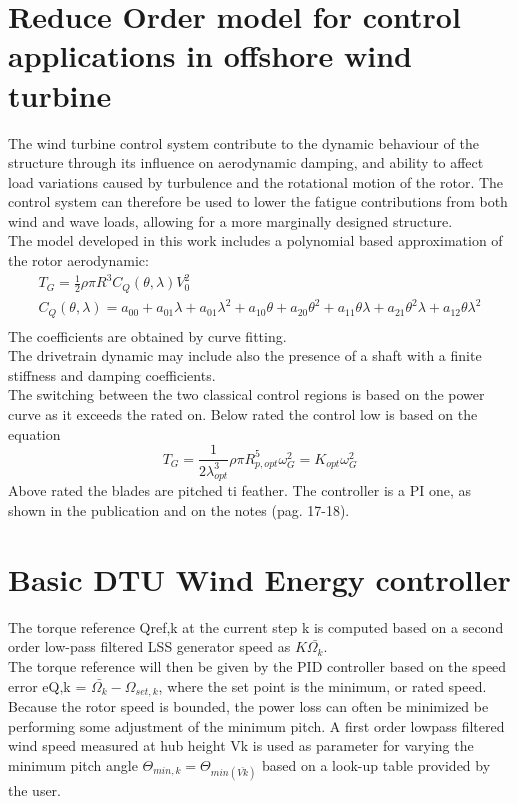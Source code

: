 \documentclass[]{article}
\begin{document}
\newpage
\section{Reduce Order model for control applications in offshore wind turbine  \cite{SMILDEN2016386}}
The wind turbine control system contribute to the dynamic behaviour of the structure through its influence on aerodynamic damping, and ability to affect load variations caused by turbulence and the rotational motion of the rotor. The control system can therefore be used to lower the fatigue contributions from both wind and wave loads, allowing for a more marginally designed structure. \\ 
The model developed in this work includes a polynomial based approximation of the rotor aerodynamic:
\begin{gather}
	T_G = \frac{1}{2}\rho\pi R^3 C_Q(\theta, \lambda) V_0^2\\
	C_Q(\theta, \lambda) = a_{00} + a_{01}\lambda +a_{01}\lambda^2 + a_{10}\theta + a_{20}\theta^2 + a_{11}\theta\lambda + a_{21}\theta^2\lambda + a_{12}\theta\lambda^2 \\
\end{gather} 
The coefficients are obtained by curve fitting.\\ 
The drivetrain dynamic may include also the presence of a shaft with a finite stiffness and damping coefficients.\\ 
The switching between the two classical control regions is based on the power curve as it exceeds the rated on. Below rated the control low is based on the equation 
\begin{equation}
	T_G = \frac{1}{2 \lambda_{opt}^3}\rho \pi R^5 _{p,opt}\omega_G^2 = K_{opt}\omega_G^2
\end{equation}
Above rated the blades are pitched ti feather. The controller is a PI one, as shown in the publication and on the notes (pag. 17-18).
\newpage
\section{Basic DTU Wind Energy controller \cite{DTU_Wind_Energy_E_0028}}
The torque reference Qref,k at the current step k is computed based on a second order low-pass filtered LSS generator speed as $K\bar{\Omega_k}$. \\
The torque reference will then be given by the PID controller based on the speed error eQ,k = $\bar{\Omega_k} - \Omega_{set,k}$, where the set point is the minimum, or rated speed.\\
Because the rotor speed is bounded, the power loss can often be minimized be performing some adjustment of the minimum pitch. A first order lowpass filtered wind speed measured at hub height Vk is used as parameter for varying the minimum pitch angle $\Theta_{min,k} = \Theta_{min(\bar{Vk})}$ based on a look-up table provided by the user.
\newpage
\end{document}
